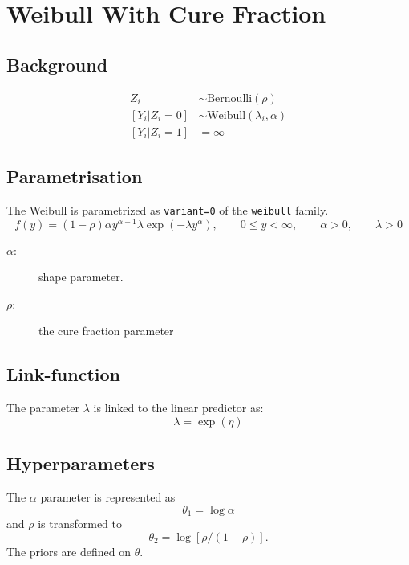 \documentclass[a4paper,11pt]{article}
\begin{document}
\section*{Weibull With Cure Fraction}

\subsection*{Background}


\begin{align*}
Z_i & \sim \text{Bernoulli}(\rho)\\
[Y_i | Z_i = 0] &\sim \text{Weibull}(\lambda_i, \alpha)\\
[Y_i | Z_i = 1] & = \infty
\end{align*}

\subsection*{Parametrisation}



The Weibull is parametrized as \texttt{variant=0} of the \texttt{weibull} family.
\begin{displaymath}
    f(y) = 
    (1-\rho) \alpha y^{\alpha-1}
    \lambda\exp( - \lambda  y^{\alpha}), 
    \qquad  0 \leq y < \infty,
    \qquad \alpha>0, \qquad \lambda>0
\end{displaymath}

\begin{description}
\item[$\alpha$:] shape parameter.
\item[$\rho$:] the cure fraction parameter
\end{description}

\subsection*{Link-function}

The parameter $\lambda$ is linked to the linear predictor as:
\[
    \lambda = \exp(\eta)
\]

\subsection*{Hyperparameters}

The $\alpha$ parameter is represented as
\[
    \theta_1 = \log\alpha
\]
and $\rho$ is transformed to
\[
\theta_2 = \log[\rho / (1-\rho)].
\]
The priors are defined on $\theta$.
\end{document}
